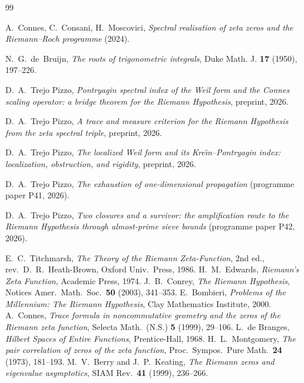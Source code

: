 \documentclass[11pt]{amsart}
\theoremstyle{definition}
\theoremstyle{remark}
\begin{document}
\begin{thebibliography}{99}

 A.~Connes, C.~Consani, H.~Moscovici,
\emph{Spectral realisation of zeta zeros and the Riemann--Roch programme}
(2024).

 N.~G.~de~Bruijn, \emph{The roots of trigonometric
integrals}, Duke Math. J. \textbf{17} (1950), 197--226.

 D.~A.~Trejo Pizzo, \emph{Pontryagin spectral index of the Weil form and the Connes scaling operator: a bridge theorem for the Riemann Hypothesis}, preprint, 2026.

 D.~A.~Trejo Pizzo, \emph{A trace and measure criterion for the Riemann Hypothesis from the zeta spectral triple}, preprint, 2026.

 D.~A.~Trejo Pizzo, \emph{The localized Weil form and its Kre\u\i n--Pontryagin index: localization, obstruction, and rigidity}, preprint, 2026.

 D.~A.~Trejo Pizzo, \emph{The exhaustion of one-dimensional
propagation} (programme paper P41, 2026).

 D.~A.~Trejo Pizzo, \emph{Two closures and a survivor: the
amplification route to the Riemann Hypothesis through almost-prime sieve
bounds} (programme paper P42, 2026).

 E.~C.~Titchmarsh, \emph{The Theory of the Riemann Zeta-Function}, 2nd ed., rev.\ D.~R.~Heath-Brown, Oxford Univ.\ Press, 1986.
 H.~M.~Edwards, \emph{Riemann's Zeta Function}, Academic Press, 1974.
 J.~B.~Conrey, \emph{The Riemann Hypothesis}, Notices Amer.\ Math.\ Soc.\ \textbf{50} (2003), 341--353.
 E.~Bombieri, \emph{Problems of the Millennium: The Riemann Hypothesis}, Clay Mathematics Institute, 2000.
 A.~Connes, \emph{Trace formula in noncommutative geometry and the zeros of the Riemann zeta function}, Selecta Math.\ (N.S.) \textbf{5} (1999), 29--106.
 L.~de Branges, \emph{Hilbert Spaces of Entire Functions}, Prentice-Hall, 1968.
 H.~L.~Montgomery, \emph{The pair correlation of zeros of the zeta function}, Proc.\ Sympos.\ Pure Math.\ \textbf{24} (1973), 181--193.
 M.~V.~Berry and J.~P.~Keating, \emph{The Riemann zeros and eigenvalue asymptotics}, SIAM Rev.\ \textbf{41} (1999), 236--266.
\end{thebibliography}
\end{document}

